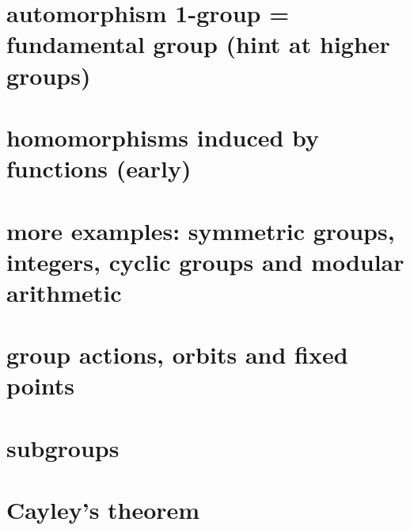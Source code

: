 \section{automorphism 1-group = fundamental group (hint at higher groups)}
\section{homomorphisms induced by functions (early)}
\section{more examples: symmetric groups, integers, cyclic groups and modular arithmetic}
\section{group actions, orbits and fixed points}
\section{subgroups}
\section{Cayley's theorem}


